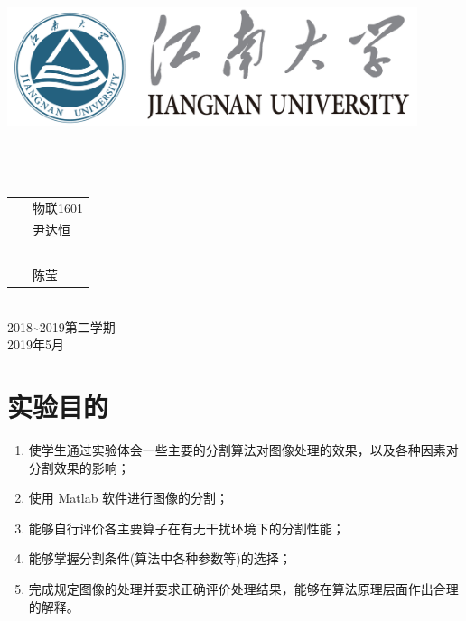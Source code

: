 \documentclass[a4paper]{ctexart}
\begin{document}
\begin{titlepage}
	\begin{center}
		\includegraphics[width=0.9\textwidth]{figure//Njust.png}\\
		\vspace{10mm}
		\textbf{}\\[0.8cm]
		\textbf{}\\[3cm]
		\textbf{}\\[3cm]
		\vspace{\fill}
		\setlength{\extrarowheight}{3mm}
		{\songti{}
			\begin{tabular}{rl}
				{\makebox[4\ccwd][s]{班\qquad 级：}} & ~\kaishu 物联1601   \\
				{\makebox[4\ccwd][s]{姓\qquad 名：}} & ~\kaishu 尹达恒     \\
				{\makebox[4\ccwd][s]{学\qquad 号：}} & ~\kaishu 1030616134 \\
				{\makebox[4\ccwd][s]{指导老师：}}    & ~\kaishu 陈莹       \\
			\end{tabular}
		}\\[2cm]
		\vspace{\fill}
		2018\textasciitilde 2019第二学期\\
		2019年5月
	\end{center}
\end{titlepage}

\renewcommand{\baselinestretch}{1.3}
\section{实验目的}
\begin{enumerate}[label=\arabic*、]
	\item 使学生通过实验体会一些主要的分割算法对图像处理的效果，以及各种因素对分割效果的影响；
	\item 使用 Matlab 软件进行图像的分割；
	\item 能够自行评价各主要算子在有无干扰环境下的分割性能；
	\item 能够掌握分割条件(算法中各种参数等)的选择；
	\item 完成规定图像的处理并要求正确评价处理结果，能够在算法原理层面作出合理的解释。
\end{enumerate}
\end{document}
